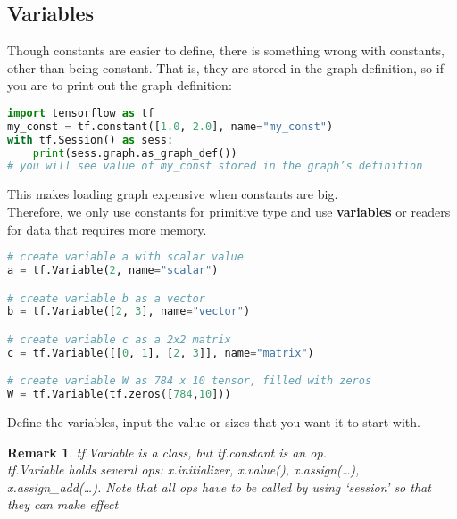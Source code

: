\documentclass{article}
\newtheorem*{remark}{Remark}
\begin{document}
	\subsection{Variables}
	Though constants are easier to define, there is something wrong with constants, other than being constant. That is, they are stored in the graph definition, so if you are to print out the graph definition:
\begin{lstlisting}[language=Python,morekeywords ={as}]
import tensorflow as tf
my_const = tf.constant([1.0, 2.0], name="my_const")
with tf.Session() as sess:
	print(sess.graph.as_graph_def())
# you will see value of my_const stored in the graph’s definition
\end{lstlisting}
	\noindent This makes loading graph expensive when constants are big.\\
	 Therefore, we only use constants for primitive type and use \textbf{variables} or readers for data that requires more memory.
	 \begin{lstlisting}[language=Python,morekeywords ={as}]
# create variable a with scalar value
a = tf.Variable(2, name="scalar")

# create variable b as a vector
b = tf.Variable([2, 3], name="vector")

# create variable c as a 2x2 matrix
c = tf.Variable([[0, 1], [2, 3]], name="matrix")

# create variable W as 784 x 10 tensor, filled with zeros
W = tf.Variable(tf.zeros([784,10]))
\end{lstlisting}
	Define the variables, input the value or sizes that you want it to start with.
	\begin{remark}
		tf.Variable is a class, but tf.constant is an op. \\
	    tf.Variable holds several ops: x.initializer, x.value(), x.assign(\dots), x.assign\_add(\dots). Note that all ops have to be called by using `session' so that they can make effect
	\end{remark}
	
\end{document}

